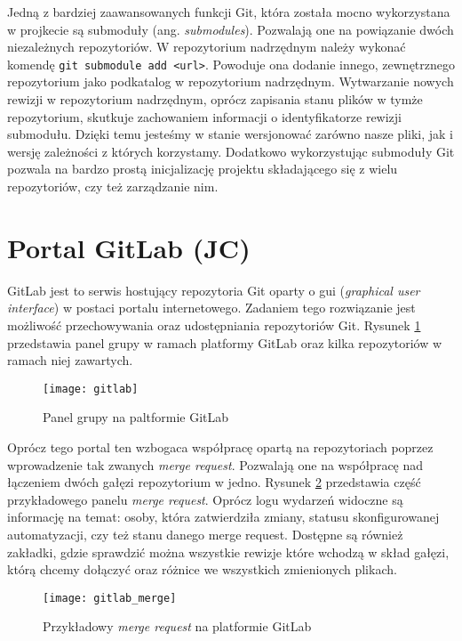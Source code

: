 Jedną z bardziej zaawansowanych funkcji Git, która została mocno wykorzystana w projkecie są submoduły (ang. \emph{submodules}). Pozwalają one na powiązanie dwóch niezależnych repozytoriów. W repozytorium nadrzędnym należy wykonać komendę \lstinline{git submodule add <url>}. Powoduje ona dodanie innego, zewnętrznego repozytorium jako podkatalog w repozytorium nadrzędnym. Wytwarzanie nowych rewizji w repozytorium nadrzędnym, oprócz zapisania stanu plików w tymże repozytorium, skutkuje zachowaniem informacji o identyfikatorze rewizji submodułu. Dzięki temu jesteśmy w stanie wersjonować zarówno nasze pliki, jak i wersję zależności z których korzystamy. Dodatkowo wykorzystując submoduły Git pozwala na bardzo prostą inicjalizację projektu składającego się z wielu repozytoriów, czy też zarządzanie nim.
\section{Portal GitLab (JC)}

GitLab jest to serwis hostujący repozytoria Git oparty o gui (\emph{graphical user interface}) w postaci portalu internetowego. Zadaniem tego rozwiązanie jest możliwość przechowywania oraz udostępniania repozytoriów Git. Rysunek \ref{fig:gitlab} przedstawia panel grupy w ramach platformy GitLab oraz kilka repozytoriów w ramach niej zawartych.

\begin{figure}[H]
    \centering
    \texttt{[image: gitlab]}
    \caption{Panel grupy na paltformie GitLab}
    \label{fig:gitlab}
\end{figure}

Oprócz tego portal ten wzbogaca współpracę opartą na repozytoriach poprzez wprowadzenie tak zwanych \emph{merge request}. Pozwalają one na współpracę nad łączeniem dwóch gałęzi repozytorium w jedno. Rysunek \ref{fig:merge} przedstawia część przykładowego panelu \emph{merge request}. Oprócz logu wydarzeń widoczne są informację na temat: osoby, która zatwierdziła zmiany, statusu skonfigurowanej automatyzacji, czy też stanu danego merge request. Dostępne są również zakładki, gdzie sprawdzić można wszystkie rewizje które wchodzą w skład gałęzi, którą chcemy dołączyć oraz różnice we wszystkich zmienionych plikach.

\begin{figure}[H]
    \centering
    \texttt{[image: gitlab\_merge]}
    \caption{Przykładowy \emph{merge request} na platformie GitLab}
    \label{fig:merge}
\end{figure}

